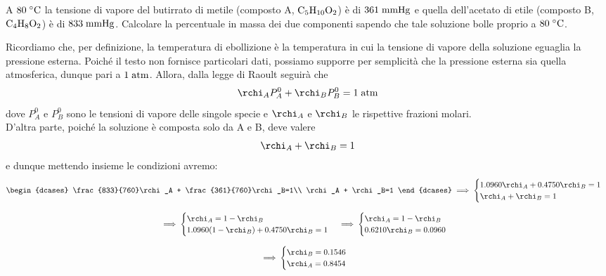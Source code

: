 \newpage

\begin{esercizio}
    A $80 \; \rm ^{\circ} C$ la tensione di vapore del butirrato di metile (composto A, $\rm C_5H_{10}O_2$) è di $361 \; \rm mmHg$ e quella dell'acetato di etile (composto B, $\rm C_4H_8O_2$) è di $833 \; \rm mmHg$. Calcolare la percentuale in massa dei due componenti sapendo che tale soluzione bolle proprio a $80 \; \rm ^{\circ} C$.
\end{esercizio}
\begin{soluzione}
    Ricordiamo che, per definizione, la temperatura di ebollizione è la temperatura in cui la tensione di vapore della soluzione eguaglia la pressione esterna. Poiché il testo non fornisce particolari dati, possiamo supporre per semplicità che la pressione esterna sia quella atmosferica, dunque pari a $1 \; \rm atm$. Allora, dalla legge di Raoult seguirà che
    \begin{equation*}
        \rchi_A P_A^0 + \rchi_B P_B^0=1 \; \rm atm
    \end{equation*}
    dove $P_A^0$ e $P_B^0$ sono le tensioni di vapore delle singole specie e $\rchi_A$ e $\rchi_B$ le rispettive frazioni molari.\\
    D'altra parte, poiché la soluzione è composta solo da A e B, deve valere
    \begin{equation*}
        \rchi_A + \rchi_B=1
    \end{equation*}
    e dunque mettendo insieme le condizioni avremo:
    \begin{gather*}
        \begin{dcases}
        \frac{833}{760}\rchi_A + \frac{361}{760}\rchi_B=1\\
        \rchi_A + \rchi_B=1
    \end{dcases}
    \implies
    \begin{cases}
        1.0960\rchi_A + 0.4750\rchi_B=1\\
        \rchi_A + \rchi_B=1
    \end{cases}
    \\[0.3cm]
    \implies
    \begin{cases}
        \rchi_A=1 - \rchi_B\\
        1.0960(1 - \rchi_B) + 0.4750\rchi_B=1
    \end{cases}
    \implies
    \begin{cases}
        \rchi_A=1 - \rchi_B\\
        0.6210 \rchi_B=0.0960
    \end{cases}
    \\[0.3cm]
    \implies
    \begin{cases}
        \rchi_B=0.1546\\
        \rchi_A=0.8454
    \end{cases}
    \end{gather*}
\end{soluzione}